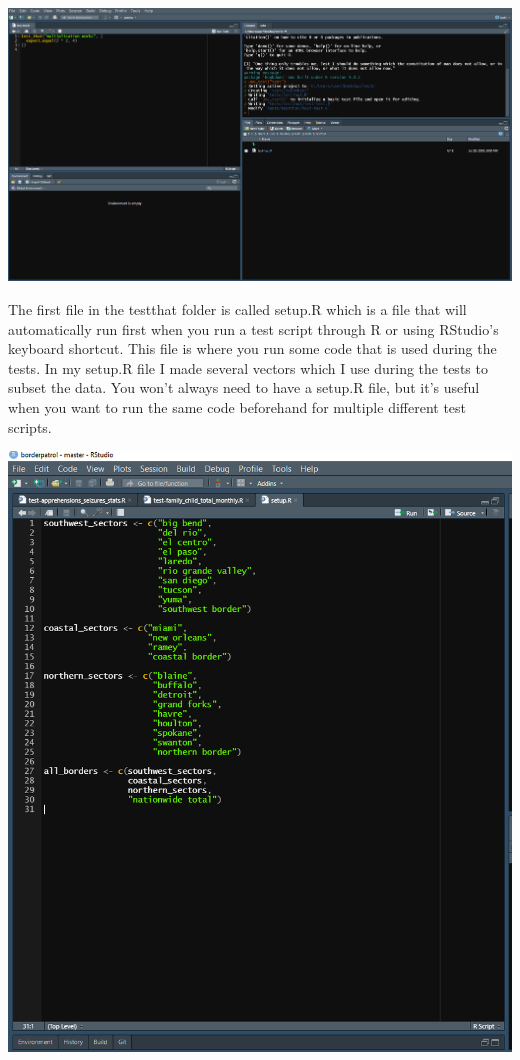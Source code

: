 \documentclass[
]{krantz}
\begin{document}
\includegraphics{images/usethis_test.PNG}

The first file in the testthat folder is called setup.R which is a file that will automatically run first when you run a test script through R or using RStudio's keyboard shortcut. This file is where you run some code that is used during the tests. In my setup.R file I made several vectors which I use during the tests to subset the data. You won't always need to have a setup.R file, but it's useful when you want to run the same code beforehand for multiple different test scripts.

\includegraphics{images/test_setup.PNG}
\end{document}
